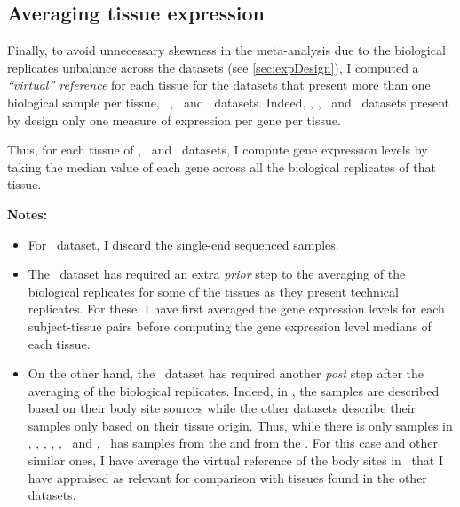 \subsection{Averaging tissue expression}

Finally, to avoid unnecessary skewness in the meta-analysis due to
the biological replicates unbalance across the datasets (see \cref{sec:expDesign}),
I computed a \emph{\enquote{virtual} reference} for each tissue
for the datasets that present more than one biological sample per tissue,
\ie\ \vt, \uhlen\ and \gtex\ datasets.
Indeed, \castle, \cutler, \kuster\ and \pandey\ datasets present by design only
one measure of expression per gene per tissue.

Thus, for each tissue of \vt, \uhlen\ and \gtex\ datasets, I compute gene
expression levels by taking the median value of each gene across all the
biological replicates of that tissue.

\textbf{Notes:}
\begin{itemize}[topsep=0pt,nosep]
        \item For \ibm\ dataset, I discard the single-end sequenced samples.
        \item The \uhlen\ dataset has required an extra \emph{prior} step to
            the averaging of the biological replicates
            for some of the tissues as they present technical replicates.
            For these, I have first averaged the gene expression levels
            for each subject-tissue pairs before computing
            the gene expression level medians of each tissue.
        \item On the other hand, the \gtex\ dataset has required another
            \emph{post} step after the averaging of the biological replicates.
            Indeed, in \gtex, the samples are described based on their
            body site sources while the other datasets describe their samples
            only based on their tissue origin.
            Thus, while there is only  samples in \castle, \vt,
            \ibm, \uhlen, \cutler, \kuster\ and \pandey,
            \gtex\ has samples from the 
            and from the .
            For this case and other similar ones,
            I have average the virtual reference of the body sites in \gtex\
            that I have appraised as relevant for comparison with tissues found
            in the other datasets.
\end{itemize}

